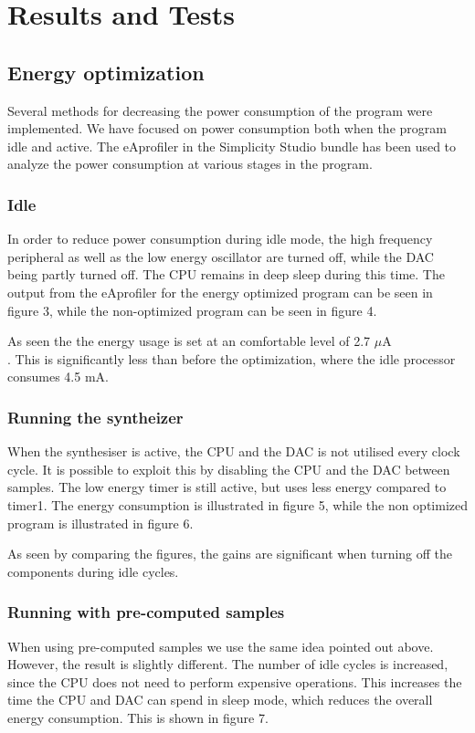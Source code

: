 \section{Results and Tests}

\subsection{Energy optimization}
Several methods for decreasing the power consumption of the program were implemented. We have focused on power consumption both when the program idle and active. The eAprofiler in the Simplicity Studio bundle has been used to analyze the power consumption at various stages in the program.

\subsubsection{Idle}
In order to reduce power consumption during idle mode, the high frequency peripheral as well as the low energy oscillator are turned off, while the DAC being partly turned off. The CPU remains in deep sleep during this time. The output from the eAprofiler for the energy optimized program can be seen in figure 3, while the non-optimized program can be seen in figure 4. 





As seen the the energy usage is set at an comfortable level of 2.7 $\mu$A \\. This is significantly less than before the optimization, where the idle processor consumes 4.5 mA. 

\subsubsection{Running the syntheizer}
When the synthesiser is active, the CPU and the DAC is not utilised every clock cycle. It is possible to exploit this by disabling the CPU and the DAC between samples. The low energy timer is still active, but uses less energy compared to timer1. The energy consumption is illustrated in figure 5, while the non optimized program is illustrated in figure 6.    




As seen by comparing the figures, the gains are significant when turning off the components during idle cycles. 


\subsubsection{Running with pre-computed samples}
When using pre-computed samples we use the same idea pointed out above. However, the result is slightly different. The number of idle cycles is increased, since the CPU does not need to perform expensive operations. This increases the time the CPU and DAC can spend in sleep mode, which reduces the overall energy consumption. This is shown in figure 7.

